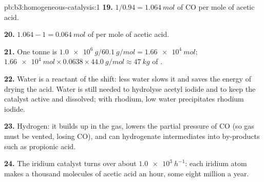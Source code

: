\begin{solution}{pb:b3:homogeneous-catalysis:1}
\textbf{19.} $1/0.94 = \qty{1.064}{mol}$ of CO per mole of acetic acid.

\textbf{20.} $1.064 - 1 = \qty{0.064}{mol}$ of  per mole of acetic acid.

\textbf{21.} One tonne is $\qty{1.0e6}{g}/\qty{60.1}{g/mol} = \qty{1.66e4}{mol}$; $\qty{1.66e4}{mol} \times 0.0638 \times \qty{44.0}{g/mol} \approx \qty{47}{kg}$ of .

\textbf{22.} Water is a reactant of the shift: less water slows it and saves the energy
of drying the acid. Water is still needed to hydrolyse acetyl iodide and to keep the
catalyst active and dissolved; with rhodium, low water precipitates rhodium
iodide.

\textbf{23.} Hydrogen: it builds up in the gas, lowers the partial pressure of CO
(so gas must be vented, losing CO), and can hydrogenate intermediates into
by-products such as propionic acid.

\textbf{24.} The iridium catalyst turns over about $\qty{1.0e3}{h^{-1}}$: each iridium atom makes a
thousand molecules of acetic acid an hour, some eight million a year.
\end{solution}

